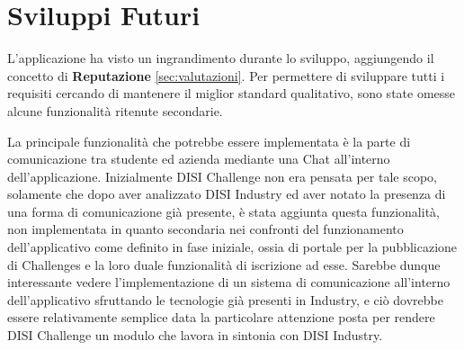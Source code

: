 \section{Sviluppi Futuri}
L'applicazione ha visto un ingrandimento durante lo sviluppo, aggiungendo il concetto di \textbf{Reputazione} \ref{sec:valutazioni}. Per permettere di sviluppare tutti i requisiti cercando di mantenere il miglior standard qualitativo, sono state omesse alcune funzionalità ritenute secondarie.

La principale funzionalità che potrebbe essere implementata è la parte di comunicazione tra studente ed azienda mediante una Chat all'interno dell'applicazione. Inizialmente DISI Challenge non era pensata per tale scopo, solamente che dopo aver analizzato DISI Industry ed aver notato la presenza di una forma di comunicazione già presente, è stata aggiunta questa funzionalità, non implementata in quanto secondaria nei confronti del funzionamento dell'applicativo come definito in fase iniziale, ossia di portale per la pubblicazione di Challenges e la loro duale funzionalità di iscrizione ad esse. Sarebbe dunque interessante vedere l'implementazione di un sistema di comunicazione all'interno dell'applicativo sfruttando le tecnologie già presenti in Industry, e ciò dovrebbe essere relativamente semplice data la particolare attenzione posta per rendere DISI Challenge un modulo che lavora in sintonia con DISI Industry.

